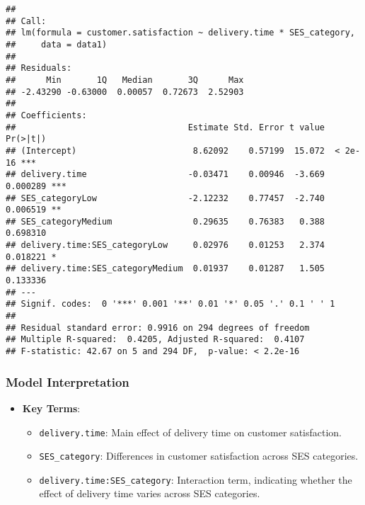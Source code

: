\documentclass[
]{article}
\newenvironment{Shaded}{\begin{snugshade}}{\end{snugshade}}
\newcommand{\CommentTok}[1]{\textcolor[rgb]{0.56,0.35,0.01}{\textit{#1}}}
\newcommand{\NormalTok}[1]{#1}
\newcommand{\OtherTok}[1]{\textcolor[rgb]{0.56,0.35,0.01}{#1}}
\newcommand{\SpecialCharTok}[1]{\textcolor[rgb]{0.81,0.36,0.00}{\textbf{#1}}}
\providecommand{\tightlist}{%
  \setlength{\itemsep}{0pt}\setlength{\parskip}{0pt}}
\begin{document}
\begin{verbatim}
## 
## Call:
## lm(formula = customer.satisfaction ~ delivery.time * SES_category, 
##     data = data1)
## 
## Residuals:
##      Min       1Q   Median       3Q      Max 
## -2.43290 -0.63000  0.00057  0.72673  2.52903 
## 
## Coefficients:
##                                  Estimate Std. Error t value Pr(>|t|)    
## (Intercept)                       8.62092    0.57199  15.072  < 2e-16 ***
## delivery.time                    -0.03471    0.00946  -3.669 0.000289 ***
## SES_categoryLow                  -2.12232    0.77457  -2.740 0.006519 ** 
## SES_categoryMedium                0.29635    0.76383   0.388 0.698310    
## delivery.time:SES_categoryLow     0.02976    0.01253   2.374 0.018221 *  
## delivery.time:SES_categoryMedium  0.01937    0.01287   1.505 0.133336    
## ---
## Signif. codes:  0 '***' 0.001 '**' 0.01 '*' 0.05 '.' 0.1 ' ' 1
## 
## Residual standard error: 0.9916 on 294 degrees of freedom
## Multiple R-squared:  0.4205, Adjusted R-squared:  0.4107 
## F-statistic: 42.67 on 5 and 294 DF,  p-value: < 2.2e-16
\end{verbatim}

\subsubsection{Model Interpretation}\label{model-interpretation}

\begin{itemize}
\tightlist
\item
  \textbf{Key Terms}:

  \begin{itemize}
  \tightlist
  \item
    \texttt{delivery.time}: Main effect of delivery time on customer
    satisfaction.
  \item
    \texttt{SES\_category}: Differences in customer satisfaction across
    SES categories.
  \item
    \texttt{delivery.time:SES\_category}: Interaction term, indicating
    whether the effect of delivery time varies across SES categories.
  \end{itemize}
\end{itemize}

\begin{Shaded}
\end{Shaded}
\end{document}
